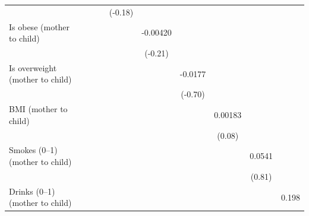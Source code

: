 \begin{table}[htbp]
\begin{tabular}{l*{9}{c}}
            &                     &                     &                     &     (-0.18)         &                     &                     &                     &                     &                     \\
Is obese (mother to child)&                     &                     &                     &                     &    -0.00420         &                     &                     &                     &                     \\
            &                     &                     &                     &                     &     (-0.21)         &                     &                     &                     &                     \\
Is overweight (mother to child)&                     &                     &                     &                     &                     &     -0.0177         &                     &                     &                     \\
            &                     &                     &                     &                     &                     &     (-0.70)         &                     &                     &                     \\
BMI (mother to child)&                     &                     &                     &                     &                     &                     &     0.00183         &                     &                     \\
            &                     &                     &                     &                     &                     &                     &      (0.08)         &                     &                     \\
Smokes (0–1) (mother to child)&                     &                     &                     &                     &                     &                     &                     &      0.0541         &                     \\
            &                     &                     &                     &                     &                     &                     &                     &      (0.81)         &                     \\
Drinks (0–1) (mother to child)&                     &                     &                     &                     &                     &                     &                     &                     &       0.198\sym{***}\\

\end{tabular}
\end{table}
